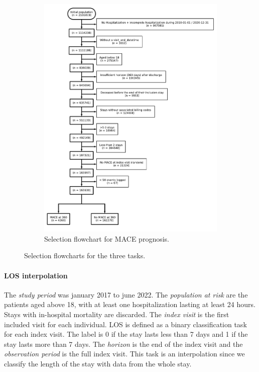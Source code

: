 \documentclass[french,12pt,twoside,a4paper]{book}
\begin{document}
\begin{appendices}
\begin{figure}[!h]
\begin{subfigure}[b]{0.5\textwidth}
      \includegraphics[width=1.1\textwidth]{img/chapter_3/flowchart_t3_mace.pdf}
      \caption{Selection flowchart for MACE prognosis.}
      \label{apd:fig:flowchart_t3}
    \end{subfigure}
    \caption{Selection flowcharts for the three tasks.}
    \label{apd:fig:flowcharts}
  \end{figure}

  \paragraph{LOS interpolation}\label{apd:task_details:los}

  The \emph{study period} was january 2017 to june 2022. The \emph{population at
    risk} are the patients aged above 18, with at least one hospitalization
  lasting at least 24 hours. Stays with in-hospital mortality are discarded. The
  \emph{index visit} is the first included visit for each individual. LOS is
  defined as a binary classification task for each index visit. The label is 0
  if the stay lasts less than 7 days and 1 if the stay lasts more than 7 days.
  The \emph{horizon} is the end of the index visit and the \emph{observation
    period} is the full index visit. This task is an interpolation since we
  classify the length of the stay with data from the whole stay.


\end{appendices}
\end{document}
